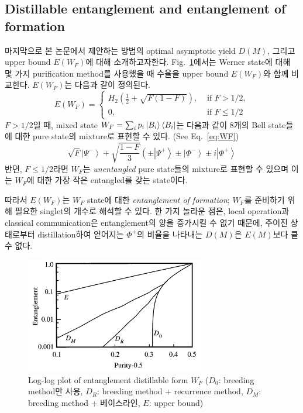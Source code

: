 \documentclass[
]{kaohandt}
\begin{document}
\subsection{Distillable entanglement and entanglement of formation}
마지막으로 본 논문에서 제안하는 방법의 optimal asymptotic yield $D(M)$, 그리고 upper bound $E(W_F)$에 대해 소개하고자한다.
Fig.~\ref{fig:plot}에서는 Werner state에 대해 몇 가지 purification method를 사용했을 때 수율을 upper bound $E(W_F)$와 함께 비교한다. $E(W_F)$는 다음과 같이 정의된다.
\begin{equation}
    E\left(W_F\right)= \begin{cases}H_2\left(\frac{1}{2}+\sqrt{F(1-F)}\right), & \text { if } F>1 / 2, \\ 0, & \text { if } F \leq 1 / 2\end{cases}
\end{equation}
$F > 1/2$일 때, mixed state $W_F = \sum_i p_i \ket{B_i}\bra{B_i}$는 다음과 같이 8개의 Bell state들에 대한 pure state의 mixture로 표현할 수 있다. (See Eq.~\eqref{eq:WF})
\begin{equation}
    \sqrt{F}\left|\Psi^{-}\right\rangle+\sqrt{\frac{1-F}{3}}\left( \pm\left|\Psi^{+}\right\rangle \pm\left|\Phi^{-}\right\rangle \pm i\left|\Phi^{+}\right\rangle\right.
\end{equation}
반면, $F \le 1/2$라면 $W_F$는 \textit{unentangled} pure state들의 mixture로 표현할 수 있으며 이는 $W_F$에 대한 가장 작은 entangled를 갖는 state이다. 

따라서 $E(W_F)$는 $W_F$ state에 대한 \textit{entanglement of formation}; $W_F$를 준비하기 위해 필요한 singlet의 개수로 해석할 수 있다. 
한 가지 놀라운 점은, local operation과 classical communication은 entanglement의 양을 증가시킬 수 없기 때문에, 주어진 상태로부터 distillation하여 얻어지는 $\Phi^+$의 비율을 나타내는 $D(M)$은 $E(M)$보다 클 수 없다.

\begin{figure}[h]
    \centering
    \includegraphics[width=0.7\textwidth]{image/figure_1.png}
    \caption{Log-log plot of entanglement distillable form $W_F$ ($D_0$: breeding method만 사용, $D_R$: breeding method + recurrence method, $D_M$: breeding method + 베이스라인, $E$: upper bound)}
    \label{fig:plot}
\end{figure}
\end{document}
